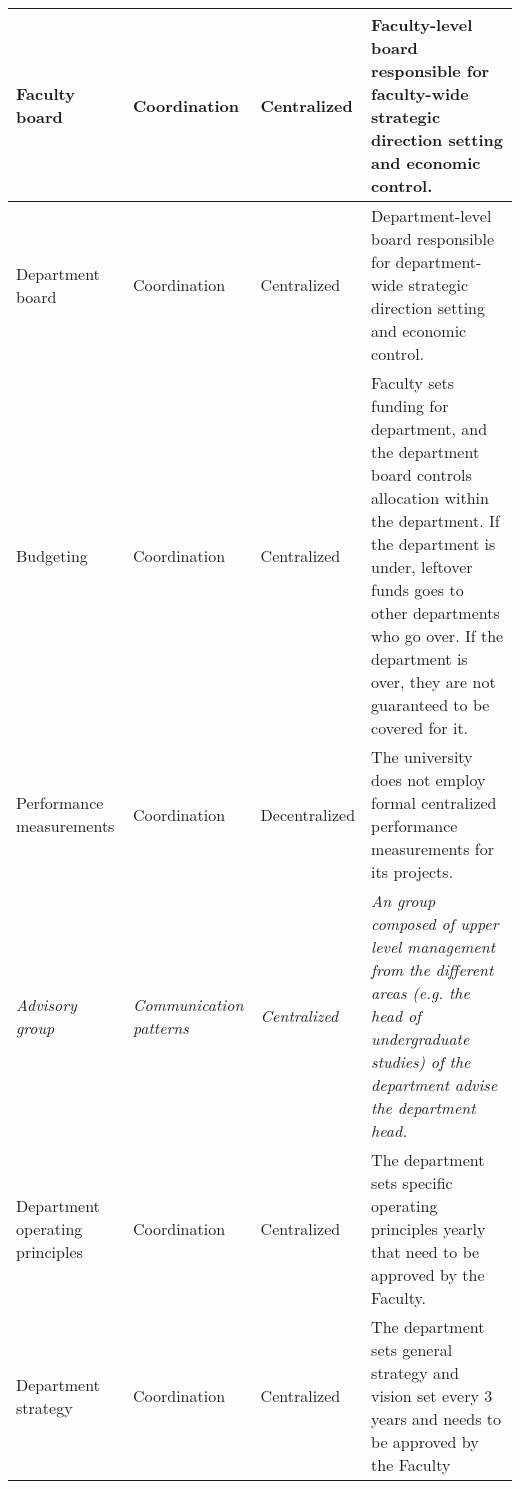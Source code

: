 \begin{table}
\begin{tabular}{ | p{} | p{}| p{} | p{}|}
 Faculty board &
 Coordination &
 Centralized &
 Faculty-level board responsible for faculty-wide strategic direction setting and economic control. \\
%
\hline
%
%
 Department board &
 Coordination &
 Centralized &
 Department-level board responsible for department-wide strategic direction setting and economic control. \\
%
\hline
%
 Budgeting &
 Coordination &
 Centralized &
 Faculty sets funding for department, and the department board controls allocation within the department. If the department is under, leftover funds goes to other departments who go over. If the department is over, they are not guaranteed to be covered for it. \\
%
\hline
%
%
 Performance measurements &
 Coordination &
 Decentralized &
 The university does not employ formal centralized performance measurements for its projects.  \\
%
\hline
%
 \textit{Advisory group} &
 \textit{Communication patterns} &
 \textit{Centralized} &
 \textit{An group composed of upper level management from the different areas (e.g. the head of undergraduate studies) of the department advise the department head.} \\
%
\hline
%
%
 Department operating principles &
 Coordination &
 Centralized &
 The department sets specific operating principles  yearly that need to be approved by the Faculty. \\
%
\hline
%
%
 Department strategy &
 Coordination &
 Centralized &
 The department sets general strategy and vision set every 3 years and needs to be approved by the Faculty \\
%
\hline

\end{tabular}
\end{table}

